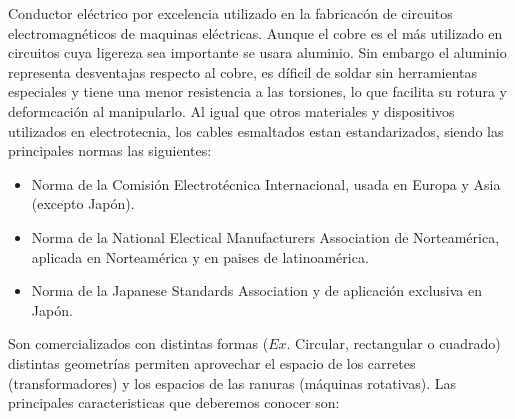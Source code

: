 \documentclass{report}
\begin{document}
      Conductor eléctrico por excelencia utilizado en la fabricacón de circuitos electromagnéticos de maquinas eléctricas.
      Aunque el cobre es el más utilizado en circuitos cuya ligereza sea importante se usara aluminio. Sin embargo el aluminio representa 
      desventajas respecto al cobre, es díficil de soldar sin herramientas especiales y tiene una menor resistencia a las torsiones, lo que facilita
      su rotura y deformcación al manipularlo.
      \fspace{1em}
      Al igual que otros materiales y dispositivos utilizados en electrotecnia, los cables esmaltados estan estandarizados, siendo las principales normas
      las siguientes: 
      \begin{itemize}
        \item{}
          Norma de la Comisión Electrotécnica Internacional, usada en Europa y Asia (excepto Japón).
      \item{}
          Norma de la National Electical Manufacturers Association de Norteamérica, aplicada en Norteamérica y en paises de latinoamérica.
        \item{}
          Norma de la Japanese Standards Association y de aplicación exclusiva en Japón.
      \end{itemize}
      \vspace{2em}
      Son comercializados con distintas formas ($Ex.$ Circular, rectangular o cuadrado) distintas geometrías permiten
      aprovechar el espacio de los carretes (transformadores) y los espacios de las ranuras (máquinas rotativas).  
      \fspace{1em}
      Las principales caracteristicas que deberemos conocer son:
\end{document}
